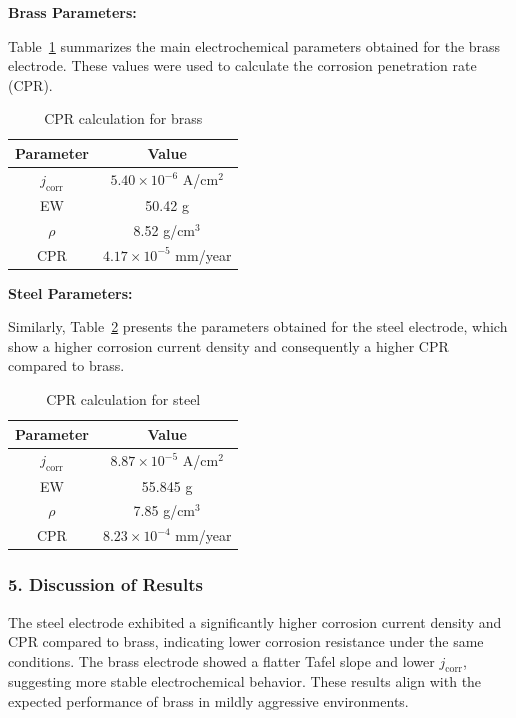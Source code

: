 \vspace{0.2cm}
\textbf{Brass Parameters:}

Table~\ref{tab:cpr_brass} summarizes the main electrochemical parameters obtained for 
the brass electrode. These values were used to calculate the corrosion penetration rate (CPR).

\begin{table}[h!]
\centering
\caption{CPR calculation for brass}
\label{tab:cpr_brass}
\begin{tabular}{|c|c|}
\hline
Parameter & Value \\
\hline
\( j_{\text{corr}} \) & \( 5.40 \times 10^{-6} \) A/cm\(^2\) \\
EW & 50.42 g \\
\( \rho \) & 8.52 g/cm\(^3\) \\
CPR & \( 4.17 \times 10^{-5} \) mm/year \\
\hline
\end{tabular}
\end{table}

\vspace{0.2cm}
\textbf{Steel Parameters:}

Similarly, Table~\ref{tab:cpr_steel} presents the parameters obtained for the steel electrode, 
which show a higher corrosion current density and consequently a higher CPR compared to brass.

\begin{table}[h!]
\centering
\caption{CPR calculation for steel}
\label{tab:cpr_steel}
\begin{tabular}{|c|c|}
\hline
Parameter & Value \\
\hline
\( j_{\text{corr}} \) & \( 8.87 \times 10^{-5} \) A/cm\(^2\) \\
EW & 55.845 g \\
\( \rho \) & 7.85 g/cm\(^3\) \\
CPR & \( 8.23 \times 10^{-4} \) mm/year \\
\hline
\end{tabular}
\end{table}


\vspace{0.2cm}
\subsubsection*{5. Discussion of Results}

The steel electrode exhibited a significantly higher corrosion current density and CPR compared to brass, indicating lower corrosion resistance under the same conditions. The brass electrode showed a flatter Tafel slope and lower \( j_{\text{corr}} \), suggesting more stable electrochemical behavior. These results align with the expected performance of brass in mildly aggressive environments.


